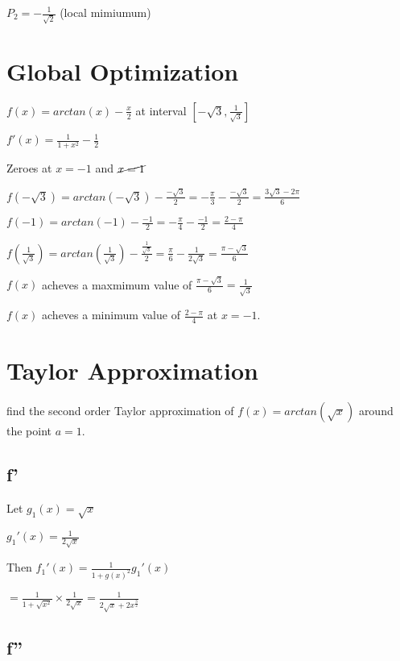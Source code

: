 \documentclass[12pt,a4paper]{article}
\begin{document}
$P_2 = -\frac{1}{\sqrt{2}}$ (local mimiumum)

\newpage

\section*{Global Optimization}

$f(x) = arctan(x) - \frac{x}{2}$ at interval $[-\sqrt{3}, \frac{1}{\sqrt{3}}]$

\noindent $f'(x) = \frac{1}{1 + x^2} - \frac{1}{2}$

\noindent Zeroes at $x = -1$ and $\cancel{x = 1}$

\noindent $f(-\sqrt{3}) = arctan(-\sqrt{3}) - \frac{-\sqrt{3}}{2} = -\frac{\pi}{3} - \frac{-\sqrt{3}}{2} = \frac{3\sqrt{3} - 2\pi}{6}$

\noindent $f(-1) = arctan (-1) - \frac{-1}{2} = -\frac{\pi}{4} - \frac{-1}{2} = \frac{2-\pi}{4}$

\noindent $f(\frac{1}{\sqrt{3}}) = arctan (\frac{1}{\sqrt{3}}) - \frac{\frac{1}{\sqrt{3}}}{2} = \frac{\pi}{6} - \frac{1}{2\sqrt{3}} = \frac{\pi - \sqrt{3}}{6}$

\noindent $f(x)$ acheves a maxmimum value of $\frac{\pi - \sqrt{3}}{6} = \frac{1}{\sqrt{3}}$

\noindent $f(x)$ acheves a minimum value of $\frac{2 -\pi}{4}$ at $x=-1$.

\newpage

\section*{Taylor Approximation}

\noindent find the second order Taylor approximation of $f(x) = arctan(\sqrt{x})$ around the point $a=1$.

\subsection*{f'}

\noindent Let $g_1(x) = \sqrt{x}$

\noindent $g_1'(x) = \frac{1}{2\sqrt{x}}$

\noindent Then $f_1'(x) = \frac{1}{1+g(x)^2}g_1'(x)$

\noindent $= \frac{1}{1+\sqrt{x^2}} \times \frac{1}{2\sqrt{x}} = \frac{1}{2\sqrt{x} + 2x^{\frac{3}{2}}}$

\subsection*{f''}
\end{document}
